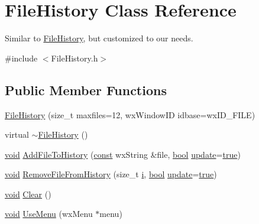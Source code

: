 \hypertarget{class_file_history}{}\section{File\+History Class Reference}
\label{class_file_history}


Similar to \hyperlink{class_file_history}{File\+History}, but customized to our needs.  




{\ttfamily \#include $<$File\+History.\+h$>$}

\subsection*{Public Member Functions}
\begin{DoxyCompactItemize}
\item 
\hyperlink{class_file_history_a605277a1c3bc6f42bdf1efe20aaeb135}{File\+History} (size\+\_\+t maxfiles=12, wx\+Window\+ID idbase=wx\+I\+D\+\_\+\+F\+I\+LE)
\item 
virtual \hyperlink{class_file_history_a1383b164338e883d266613692c7cbdcb}{$\sim$\+File\+History} ()
\item 
\hyperlink{sound_8c_ae35f5844602719cf66324f4de2a658b3}{void} \hyperlink{class_file_history_a052908e7fbdf57a498a4b10071fa3369}{Add\+File\+To\+History} (\hyperlink{getopt1_8c_a2c212835823e3c54a8ab6d95c652660e}{const} wx\+String \&file, \hyperlink{mac_2config_2i386_2lib-src_2libsoxr_2soxr-config_8h_abb452686968e48b67397da5f97445f5b}{bool} \hyperlink{g72x__priv_8h_a329191add8d6891b5e32a2148f04932f}{update}=\hyperlink{mac_2config_2i386_2lib-src_2libsoxr_2soxr-config_8h_a41f9c5fb8b08eb5dc3edce4dcb37fee7}{true})
\item 
\hyperlink{sound_8c_ae35f5844602719cf66324f4de2a658b3}{void} \hyperlink{class_file_history_ae2f357189d2458b1b5e8099dc99730b0}{Remove\+File\+From\+History} (size\+\_\+t \hyperlink{checksum_8c_ab80e330a3bc9e38c1297fe17381e92b4}{i}, \hyperlink{mac_2config_2i386_2lib-src_2libsoxr_2soxr-config_8h_abb452686968e48b67397da5f97445f5b}{bool} \hyperlink{g72x__priv_8h_a329191add8d6891b5e32a2148f04932f}{update}=\hyperlink{mac_2config_2i386_2lib-src_2libsoxr_2soxr-config_8h_a41f9c5fb8b08eb5dc3edce4dcb37fee7}{true})
\item 
\hyperlink{sound_8c_ae35f5844602719cf66324f4de2a658b3}{void} \hyperlink{class_file_history_a6658d24f788552a4f63e987a3cd84dd8}{Clear} ()
\item 
\hyperlink{sound_8c_ae35f5844602719cf66324f4de2a658b3}{void} \hyperlink{class_file_history_ad00abb5d8190125179eb1441715139dc}{Use\+Menu} (wx\+Menu $\ast$menu)

\end{DoxyCompactItemize}
